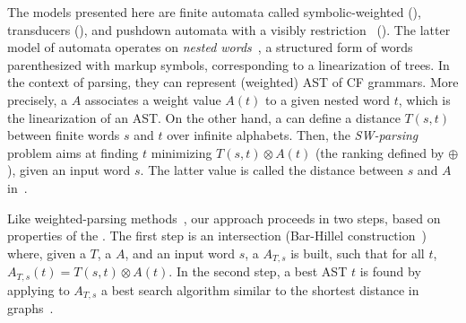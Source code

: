 %
%
The models presented here are finite automata called symbolic-weighted (\SWA),
transducers (\SWT), and pushdown automata
with a visibly restriction~\cite{AlurMadhusudan09nested} (\SWVPA).
The latter model of automata operates on \emph{nested words}~\cite{AlurMadhusudan09nested},
a structured form of words parenthesized with markup symbols,
corresponding to a linearization of trees.
In the context of parsing, they can represent (weighted) AST of CF grammars.
More precisely, a \SWVPA $A$ associates a weight value $A(t)$ %
to a given nested word $t$, which is the linearization of an AST. %
%
On the other hand,
a \SWT can define a distance $T(s, t)$ between finite words $s$ and $t$
over infinite alphabets. %
Then, the \emph{SW-parsing} problem aims at %
finding $t$ minimizing
$T(s, t) \otimes A(t)$ (\wrt the ranking defined by $\oplus$), given an input word $s$.
The latter value is called the distance between $s$ and $A$ in~\cite{Mohri03EDWA}.
%

Like weighted-parsing
methods~\cite{Goodman99SemiringParsing,Nederhof03weightedParsing,MorbitzVogler19weighted-parsing},
our approach proceeds in two steps,
based on properties of the \swM.
The first step is an intersection
(Bar-Hillel construction~\cite{GruneJacobs08parsing})
where, given a \SWT $T$, a \SWVPA $A$, and an input word $s$,
a \SWVPA $A_{T, s}$ is built, such that for all $t$, $A_{T, s}(t) = T(s, t) \otimes A(t)$.
In the second step, a best AST $t$ is found by applying to $A_{T, s}$
a best search algorithm similar to the shortest distance
in graphs~\cite{Mohri02semiring,Huang05kbest}.
%

